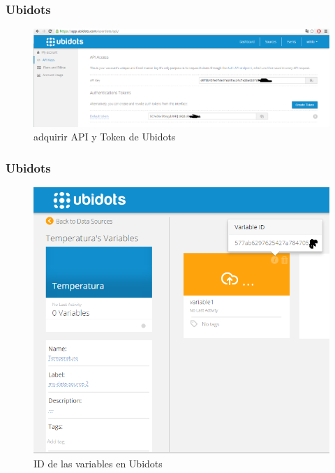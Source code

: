 \documentclass[10pt]{beamer}\usepackage[]{graphicx}\usepackage[]{color}
\begin{document}
\begin{frame}
	\frametitle{Ubidots}
	
 	\begin{figure}[ht]
 		\centering
 		\includegraphics[scale=0.3]{ubi2}   %
 		\caption{adquirir API y Token de Ubidots} 		
 	\end{figure}
\end{frame}

\begin{frame}
	\frametitle{Ubidots}
	
 	\begin{figure}[H]
 		\centering
 		\includegraphics[scale=0.3]{ubi5}   %
 		\caption{ID de las variables en Ubidots} 		
 	\end{figure}
\end{frame}
\end{document}
